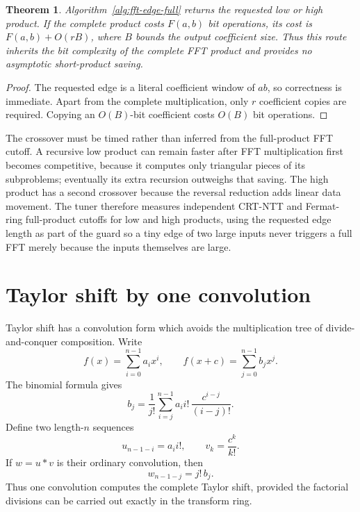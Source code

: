 \documentclass[11pt]{book}
\newtheorem{theorem}{Theorem}[section]
\theoremstyle{definition}
\begin{document}
\begin{theorem}
Algorithm~\ref{alg:fft-edge-full} returns the requested low or high product.
If the complete product costs $F(a,b)$ bit operations, its cost is
$F(a,b)+O(rB)$, where $B$ bounds the output coefficient size.  Thus this route
inherits the bit complexity of the complete FFT product and provides no
asymptotic short-product saving.
\end{theorem}

\begin{proof}
The requested edge is a literal coefficient window of $ab$, so correctness is
immediate.  Apart from the complete multiplication, only $r$ coefficient
copies are required.  Copying an $O(B)$-bit coefficient costs $O(B)$ bit
operations.
\end{proof}

The crossover must be timed rather than inferred from the full-product FFT
cutoff.  A recursive low product can remain faster after FFT multiplication
first becomes competitive, because it computes only triangular pieces of its
subproblems; eventually its extra recursion outweighs that saving.  The high
product has a second crossover because the reversal reduction adds linear data
movement.  The tuner therefore measures independent CRT-NTT and Fermat-ring
full-product cutoffs for low and high products, using the requested edge length
as part of the guard so a tiny edge of two large inputs never triggers a full
FFT merely because the inputs themselves are large.


\section{Taylor shift by one convolution}
\label{sec:fft-taylor-shift}

Taylor shift has a convolution form which avoids the multiplication tree of
divide-and-conquer composition.  Write
\[
 f(x)=\sum_{i=0}^{n-1} a_i x^i,
 \qquad
 f(x+c)=\sum_{j=0}^{n-1} b_j x^j.
\]
The binomial formula gives
\begin{equation}\label{eq:taylor-convolution-coeff}
 b_j=\frac1{j!}\sum_{i=j}^{n-1} a_i i!\,
          \frac{c^{i-j}}{(i-j)!}.
\end{equation}
Define two length-$n$ sequences
\begin{equation}\label{eq:taylor-convolution-sequences}
 u_{n-1-i}=a_i i!,\qquad
 v_k=\frac{c^k}{k!}.
\end{equation}
If $w=u*v$ is their ordinary convolution, then
\begin{equation}\label{eq:taylor-convolution-extract}
 w_{n-1-j}=j!\,b_j.
\end{equation}
Thus one convolution computes the complete Taylor shift, provided the factorial
divisions can be carried out exactly in the transform ring.
\end{document}
